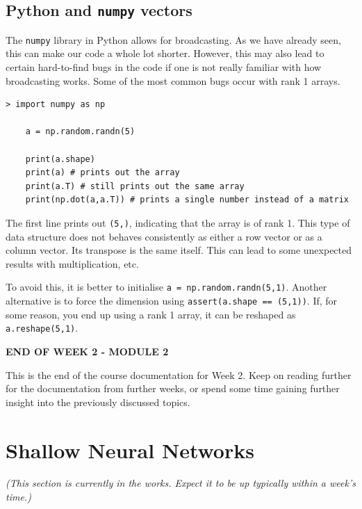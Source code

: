 \documentclass{article}[a4paper,12pt]
\theoremstyle{definition}
\begin{document}
\subsection{Python and \texttt{numpy} vectors}
The \texttt{numpy} library in Python allows for broadcasting. As we have already seen, this can make our code a whole lot shorter. However, this may also lead to certain hard-to-find bugs in the code if one is not really familiar with how broadcasting works. Some of the most common bugs occur with rank 1 arrays.
\begin{Verbatim}[tabsize=2]
> import numpy as np
	
	a = np.random.randn(5)
	
	print(a.shape)
	print(a) # prints out the array
	print(a.T) # still prints out the same array
	print(np.dot(a,a.T)) # prints a single number instead of a matrix
\end{Verbatim}
The first line prints out \texttt{(5,)}, indicating that the array is of rank 1. This type of data structure does not behaves consistently as either a row vector or as a column vector. Its transpose is the same itself. This can lead to some unexpected results with multiplication, etc. 
\vspace{6pt}

To avoid this, it is better to initialise \texttt{a = np.random.randn(5,1)}. Another alternative is to force the dimension using \texttt{assert(a.shape == (5,1))}. If, for some reason, you end up using a rank 1 array, it can be reshaped as \texttt{a.reshape(5,1)}.

\hrulefill
\begin{center}\textbf{END OF WEEK 2 - MODULE 2}\end{center}
This is the end of the course documentation for Week 2. Keep on reading further for the documentation from further weeks, or spend some time gaining further insight into the previously discussed topics.

\hrulefill
\pagebreak
\section{Shallow Neural Networks}
\textit{(This section is currently in the works. Expect it to be up typically within a week's time.)}

\hrulefill
\end{document}
